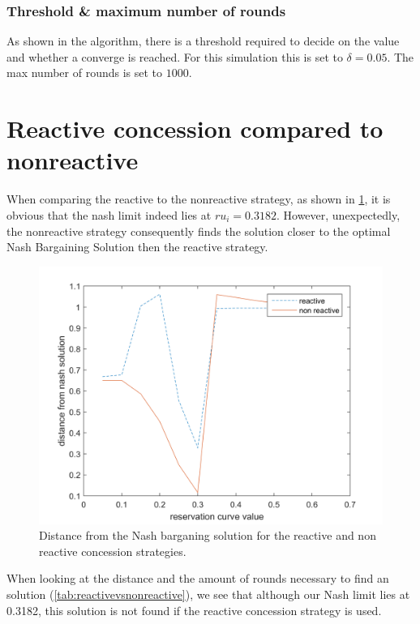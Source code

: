\subsubsection{Threshold \& maximum number of rounds}
As shown in the algorithm, there is a threshold required to decide on the value and whether a converge is reached. For this simulation this is set to $\delta = 0.05$.	The max number of rounds is set to $1000$.

\section{Reactive concession compared to nonreactive}
When comparing the reactive to the nonreactive strategy, as shown in \cref{fig:reactivevsnonreactive}, it is obvious that the nash limit indeed lies at $ru_i = 0.3182$. However, unexpectedly, the nonreactive strategy consequently finds the solution closer to the optimal Nash Bargaining Solution then the reactive strategy. 

\begin{figure}[h]
	\centering
	\includegraphics[width=0.7\linewidth]{img/reactivevsnonreactive}
	\caption{Distance from the Nash barganing solution for the reactive and non reactive concession strategies. }
	\label{fig:reactivevsnonreactive}
\end{figure}

When looking at the distance and the amount of rounds necessary to find an solution (\cref{tab:reactivevsnonreactive}), we see that although our Nash limit lies at 0.3182, this solution is not found if the reactive concession strategy is used. 

